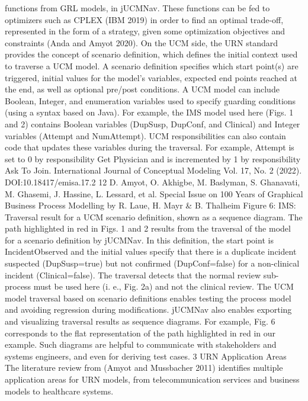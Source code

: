 functions from GRL models, in jUCMNav. These
functions can be fed to optimizers such as CPLEX
(IBM 2019) in order to find an optimal trade-off,
represented in the form of a strategy, given some
optimization objectives and constraints (Anda and
Amyot 2020). On the UCM side, the URN standard provides the concept of scenario definition,
which defines the initial context used to traverse
a UCM model. A scenario definition specifies
which start point(s) are triggered, initial values for
the model’s variables, expected end points reached
at the end, as well as optional pre/post conditions.
A UCM model can include Boolean, Integer,
and enumeration variables used to specify guarding conditions (using a syntax based on Java).
For example, the IMS model used here (Figs. 1
and 2) contains Boolean variables (DupSusp, DupConf, and Clinical) and Integer variables (Attempt
and NumAttempt). UCM responsibilities can also
contain code that updates these variables during
the traversal. For example, Attempt is set to 0 by
responsibility Get Physician and is incremented by
1 by responsibility Ask To Join.
International Journal of Conceptual Modeling
Vol. 17, No. 2 (2022). DOI:10.18417/emisa.17.2
12 D. Amyot, O. Akhigbe, M. Baslyman, S. Ghanavati, M. Ghasemi, J. Hassine, L. Lessard, et al.
Special Issue on 100 Years of Graphical Business Process Modelling by R. Laue, H. Mayr & B. Thalheim
Figure 6: IMS: Traversal result for a UCM scenario
definition, shown as a sequence diagram.
The path highlighted in red in Figs. 1 and 2
results from the traversal of the model for a
scenario definition by jUCMNav. In this definition, the start point is IncidentObserved and
the initial values specify that there is a duplicate
incident suspected (DupSusp=true) but not confirmed (DupConf=false) for a non-clinical incident
(Clinical=false). The traversal detects that the normal review sub-process must be used here (i. e.,
Fig. 2a) and not the clinical review.
The UCM model traversal based on scenario
definitions enables testing the process model and
avoiding regression during modifications. jUCMNav also enables exporting and visualizing traversal results as sequence diagrams. For example,
Fig. 6 corresponds to the flat representation of the
path highlighted in red in our example. Such diagrams are helpful to communicate with stakeholders and systems engineers, and even for deriving
test cases.
3 URN Application Areas
The literature review from (Amyot and Mussbacher 2011) identifies multiple application areas
for URN models, from telecommunication services and business models to healthcare systems.
